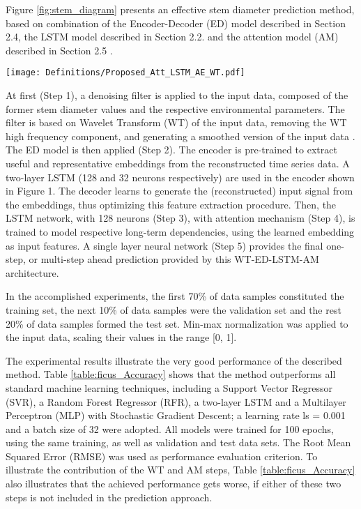 \documentclass[journal,article,accept,moreauthors,pdftex]{Definitions/mdpi}
\begin{document}
Figure \ref{fig:stem_diagram} presents an effective stem diameter prediction method, based on combination of the  Encoder-Decoder (ED) model described in Section 2.4, the LSTM model described in Section 2.2. and the attention model (AM) described in Section 2.5 \cite{ref26}.

 \begin{figure*}[tph!]
\texttt{[image: Definitions/Proposed\_Att\_LSTM\_AE\_WT.pdf]}
\centering
\caption{Deep architecture  (WT-ED-LSTM-AM) for stem diameter prediction.}
\label{fig:stem_diagram}
\end{figure*}

At first (Step 1), a denoising filter is applied to the input data, composed of the former stem diameter values and the respective environmental parameters. The filter is based on Wavelet Transform (WT) of the input data, removing the WT high frequency component, and generating a smoothed version of the input data \cite{ref120}. The ED model is then applied (Step 2). 
The encoder
is pre-trained to extract useful and representative embeddings from the
reconstructed time series data. A two-layer LSTM (128 and 32 neurons respectively) are used in the encoder shown in Figure 1.  The decoder 
learns to generate the (reconstructed) input signal from the embeddings, thus optimizing this feature extraction procedure. Then, the LSTM network, with 128 neurons (Step 3), with attention
mechanism (Step 4), is trained to model respective long-term dependencies, using the
learned embedding as input features. A single layer neural network (Step 5) provides the final one-step, or  multi-step ahead prediction provided by this WT-ED-LSTM-AM architecture.


 In the accomplished experiments, the first 70\% of data samples constituted the training set, the next 10\% of data samples were the validation set and the rest 20\% of data samples formed the test set. Min-max normalization was applied to the input data, scaling their values in the range [0, 1].
 
 
 The experimental results illustrate the very good performance of the described
method. Table \ref{table:ficus_Accuracy} shows that the method  outperforms all standard machine learning techniques, including  a Support Vector Regressor (SVR), a Random Forest Regressor (RFR), a two-layer LSTM and a Multilayer Perceptron (MLP) with Stochastic Gradient Descent; a learning rate ls = 0.001 and a batch size of 32 were adopted. All models were trained for 100 epochs, using the same training, as well as validation and test data sets. The Root Mean Squared Error (RMSE) was used as performance evaluation criterion. To illustrate the contribution of the WT and AM steps, Table \ref{table:ficus_Accuracy} also illustrates that the achieved performance gets worse, if either of these two steps is not included in the prediction approach.  
\end{document}
